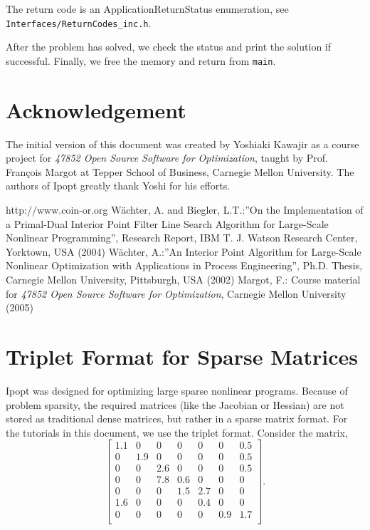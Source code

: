 \documentclass[letter,10pt]{article}
\begin{document}
{The return code is an ApplicationReturnStatus enumeration, see {\tt
Interfaces/ReturnCodes\_inc.h}.

After the problem has solved, we check the status and print the solution if 
successful. Finally, we free the memory and return from {\tt main}.

\section*{Acknowledgement}
The initial version of this document was created by Yoshiaki Kawajir
as a course project for \textit{47852 Open Source Software for
Optimization}, taught by Prof. Fran\c cois Margot at Tepper School of
Business, Carnegie Mellon University. The authors of Ipopt greatly
thank Yoshi for his efforts.

\begin{thebibliography}{99}
http://www.coin-or.org
W\"achter, A. and Biegler, L.T.:''On the Implementation of a Primal-Dual
        Interior Point Filter Line Search Algorithm for Large-Scale
        Nonlinear Programming'', Research Report, IBM T. J. Watson
        Research Center, Yorktown, USA (2004)
W\"achter, A.:''An Interior Point Algorithm for Large-Scale Nonlinear
        Optimization with Applications in Process Engineering'',
        Ph.D. Thesis, Carnegie Mellon University, Pittsburgh, USA (2002)
Margot, F.: Course material for \textit{47852 Open Source Software for
        Optimization}, Carnegie Mellon University (2005)
\end{thebibliography}


\appendix
\section{Triplet Format for Sparse Matrices}\label{app.triplet}
Ipopt was designed for optimizing large sparse nonlinear programs. 
Because of problem sparsity, the required matrices (like the Jacobian or Hessian) are not stored as traditional dense matrices, but rather in a sparse matrix format. For the tutorials in this document, we use the triplet format. 
Consider the matrix,
\[
\left[
\begin{array}{ccccccc}
1.1     & 0             & 0             & 0             & 0             & 0             & 0.5 \\
0       & 1.9   & 0             & 0             & 0             & 0             & 0.5 \\
0       & 0             & 2.6   & 0             & 0             & 0             & 0.5 \\
0       & 0             & 7.8   & 0.6   & 0             & 0             & 0    \\
0       & 0             & 0             & 1.5   & 2.7   & 0             & 0     \\
1.6     & 0             & 0             & 0             & 0.4   & 0             & 0     \\
0       & 0             & 0             & 0             & 0             & 0.9   & 1.7 \\
\end{array}
\right].
\]

}
\end{document}
